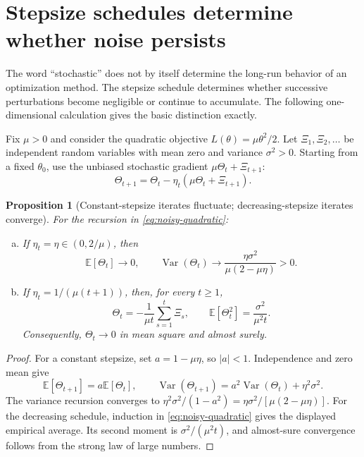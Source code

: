 \documentclass[11pt,twoside]{article}
\newcommand{\E}{\mathbb E}
\newtheorem{proposition}[theorem]{Proposition}
\theoremstyle{definition}
\theoremstyle{remark}
\begin{document}
\section{Stepsize schedules determine whether noise persists}
\label{sec:stepsize-noise}

The word ``stochastic'' does not by itself determine the long-run behavior of
an optimization method. The stepsize schedule determines whether successive
perturbations become negligible or continue to accumulate. The following
one-dimensional calculation gives the basic distinction exactly.

Fix $\mu>0$ and consider the quadratic objective
$L(\theta)=\mu\theta^2/2$. Let $\Xi_1,\Xi_2,\ldots$ be independent random
variables with mean zero and variance $\sigma^2>0$. Starting from a fixed
$\theta_0$, use the unbiased stochastic gradient $\mu\Theta_t+\Xi_{t+1}$:
\begin{equation}
 \Theta_{t+1}
 =\Theta_t-\eta_t(\mu\Theta_t+\Xi_{t+1}).
 \label{eq:noisy-quadratic}
\end{equation}

\begin{proposition}[Constant-stepsize iterates fluctuate; decreasing-stepsize iterates converge]
\label{prop:constant-decreasing-step}
For the recursion in \cref{eq:noisy-quadratic}:
\begin{enumerate}[(a),leftmargin=*]
\item If $\eta_t=\eta\in(0,2/\mu)$, then
\[
 \E[\Theta_t]\longrightarrow0,
 \qquad
 \operatorname{Var}(\Theta_t)\longrightarrow
 \frac{\eta\sigma^2}{\mu(2-\mu\eta)}>0.
\]
\item If $\eta_t=1/(\mu(t+1))$, then, for every $t\ge1$,
\[
 \Theta_t=-\frac1{\mu t}\sum_{s=1}^t\Xi_s,
 \qquad
 \E[\Theta_t^2]=\frac{\sigma^2}{\mu^2t}.
\]
Consequently, $\Theta_t\to0$ in mean square and almost surely.
\end{enumerate}
\end{proposition}

\begin{proof}
For a constant stepsize, set $a=1-\mu\eta$, so $|a|<1$. Independence and
zero mean give
\[
 \E[\Theta_{t+1}]=a\E[\Theta_t],
 \qquad
 \operatorname{Var}(\Theta_{t+1})
 =a^2\operatorname{Var}(\Theta_t)+\eta^2\sigma^2.
\]
The variance recursion converges to
$\eta^2\sigma^2/(1-a^2)=\eta\sigma^2/[\mu(2-\mu\eta)]$.
For the decreasing schedule, induction in \cref{eq:noisy-quadratic} gives the
displayed empirical average. Its second moment is
$\sigma^2/(\mu^2t)$, and almost-sure convergence follows from the strong law
of large numbers.
\end{proof}
\end{document}
